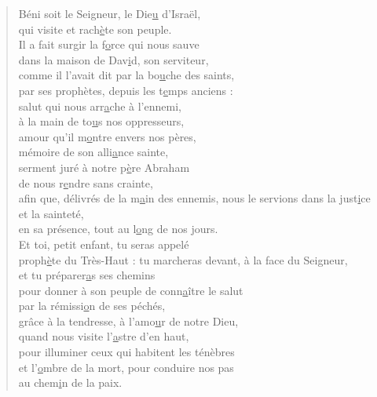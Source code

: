 \begin{verse}
Béni soit le Seigneur, le Die\underline{u} d'Israël,\\
qui visite et rach\underline{è}te son peuple.\\

Il a fait surgir la f\underline{o}rce qui nous sauve\\
dans la maison de Dav\underline{i}d, son serviteur,\\

comme il l'avait dit par la bo\underline{u}che des saints,\\
par ses prophètes, depuis les t\underline{e}mps anciens :\\

salut qui nous arr\underline{a}che à l'ennemi,\\
à la main de to\underline{u}s nos oppresseurs,\\

amour qu'il m\underline{o}ntre envers nos pères,\\
mémoire de son alli\underline{a}nce sainte,\\

serment juré à notre p\underline{è}re Abraham\\
de nous r\underline{e}ndre sans crainte,\\

afin que, délivrés de la m\underline{a}in des ennemis, \psalmdagger
{}nous le servions dans la just\underline{i}ce et la sainteté,\\
en sa présence, tout au l\underline{o}ng de nos jours.\\

Et toi, petit enfant, tu seras appelé\\
proph\underline{è}te du Très-Haut : \psalmstar
tu marcheras devant, à la face du Seigneur,\\
et tu préparer\underline{a}s ses chemins\\

pour donner à son peuple de conn\underline{a}ître le salut\\
par la rémissi\underline{o}n de ses péchés,\\

grâce à la tendresse, à l'amo\underline{u}r de notre Dieu,\\
quand nous visite l'\underline{a}stre d'en haut,\\

pour illuminer ceux qui habitent les ténèbres\\
et l'\underline{o}mbre de la mort, \psalmstar
pour conduire nos pas\\
au chem\underline{i}n de la paix.
\end{verse}
